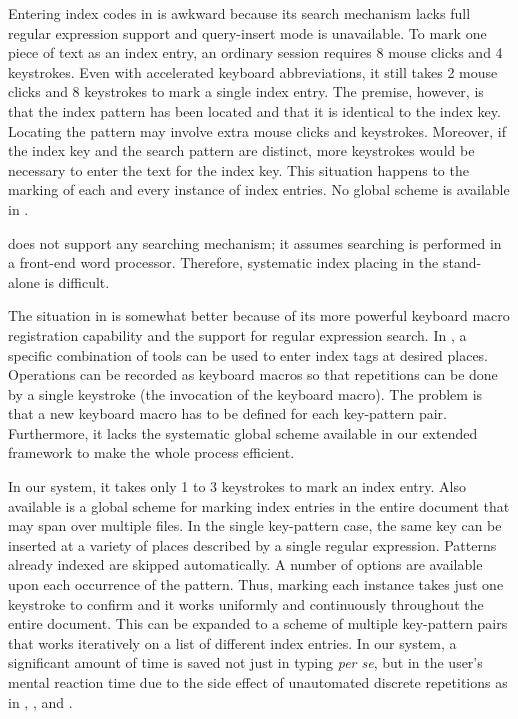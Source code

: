 Entering index codes in {\WD} is awkward because
its search mechanism lacks full regular expression support
and query-insert mode is unavailable.
To mark one piece of text as an index entry, an ordinary session
requires 8 mouse clicks and 4 keystrokes.  Even with accelerated keyboard
abbreviations, it still takes 2 mouse clicks and 8 keystrokes to mark a single
index entry.  The premise, however, is that the index pattern has been
located and that it is identical to the index key.
Locating the pattern may involve extra mouse clicks and keystrokes.
Moreover, if the index key and the search pattern are distinct, more
keystrokes would be necessary to enter the text for the index key.
This situation happens to the marking of each and every instance
of index entries.  No global scheme is available in {\WD}.

{\VP} does not support any searching mechanism; it assumes
searching is performed in a front-end word processor.
Therefore, systematic index placing in the stand-alone {\VP} is difficult.

The situation in {\FM} is somewhat better because of its more powerful
keyboard macro registration capability and the support for regular
expression search.  In {\FM}, a specific combination
of tools can be used to enter index tags at desired places.
Operations can be recorded as keyboard macros so that repetitions
can be done by a single keystroke (the invocation of the keyboard macro).
The problem is that a new keyboard macro has to be defined for each
key-pattern pair.  Furthermore, it
lacks the systematic global scheme available in our extended
framework to make the whole process efficient.

In our system, it takes only 1 to 3 keystrokes to mark an index entry.
Also available is a global scheme for marking index entries in the entire
document that may span over multiple files.  In the single key-pattern
case, the same key can be inserted at a variety of places
described by a single regular expression.  Patterns already indexed
are skipped automatically.  A number of options are
available upon each occurrence of the pattern.  Thus, marking each instance
takes just one keystroke to confirm and it works uniformly and continuously
throughout the entire document.  This can be expanded to a scheme of
multiple key-pattern pairs that works iteratively on a list of
different index entries.
In our system,
a significant amount of time is saved not just in typing {\it per se\/}, but
in the user's mental reaction time due to the side effect of
unautomated discrete repetitions as in {\FM}, {\WD}, and {\VP}.

